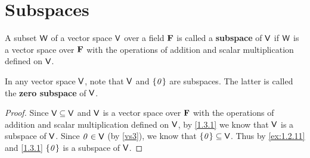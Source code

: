\section{Subspaces}\label{sec:1.3}

\begin{defn}\label{1.3.1}
    A subset \(\mathsf{W}\) of a vector space \(\mathsf{V}\) over a field \(\mathbf{F}\) is called a \textbf{subspace} of \(\mathsf{V}\) if \(\mathsf{W}\) is a vector space over \(\mathbf{F}\) with the operations of addition and scalar multiplication defined on \(\mathsf{V}\).
\end{defn}

\begin{eg}\label{1.3.2}
    In any vector space \(\mathsf{V}\), note that \(\mathsf{V}\) and \(\left\lbrace\mathit{0}\right\rbrace\) are subspaces.
    The latter is called the \textbf{zero subspace} of \(\mathsf{V}\).
\end{eg}

\begin{proof}
    Since \(\mathsf{V} \subseteq \mathsf{V}\) and \(\mathsf{V}\) is a vector space over \(\mathbf{F}\) with the operations of addition and scalar multiplication defined on \(\mathsf{V}\), by \cref{1.3.1} we know that \(\mathsf{V}\) is a subspace of \(\mathsf{V}\).
    Since \(\mathit{0} \in \mathsf{V}\) (by \ref{vs3}), we know that \(\left\lbrace\mathit{0}\right\rbrace \subseteq \mathsf{V}\).
    Thus by \cref{ex:1.2.11} and \cref{1.3.1} \(\left\lbrace\mathit{0}\right\rbrace\) is a subspace of \(\mathsf{V}\).
\end{proof}